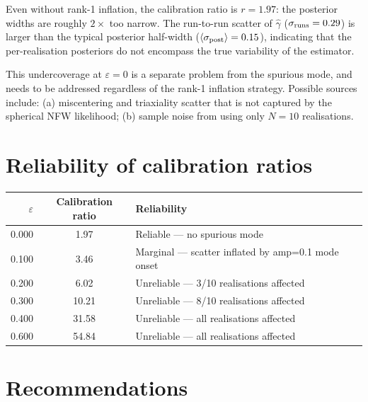 \documentclass[11pt,a4paper]{article}
\begin{document}
Even without rank-1 inflation, the calibration ratio is $r = 1.97$: the
posterior widths are roughly $2\times$ too narrow.  The run-to-run scatter of
$\hat\gamma$ ($\sigma_{\rm runs} = 0.29$) is larger than the typical posterior
half-width ($\langle\sigma_{\rm post}\rangle = 0.15$), indicating that the
per-realisation posteriors do not encompass the true variability of the
estimator.

This undercoverage at $\varepsilon=0$ is a separate problem from the spurious
mode, and needs to be addressed regardless of the rank-1 inflation strategy.
Possible sources include: (a) miscentering and triaxiality scatter that is not
captured by the spherical NFW likelihood; (b) sample noise from using only
$N=10$ realisations.

\section{Reliability of calibration ratios}

\begin{center}
\begin{tabular}{r c l}
\toprule
$\varepsilon$ & Calibration ratio & Reliability \\
\midrule
0.000 & 1.97 & \textcolor{okgreen}{Reliable — no spurious mode} \\
0.100 & 3.46 & \textcolor{warnorange}{Marginal — scatter inflated by amp=0.1 mode onset} \\
0.200 & 6.02 & \textcolor{warnred}{Unreliable — 3/10 realisations affected} \\
0.300 & 10.21 & \textcolor{warnred}{Unreliable — 8/10 realisations affected} \\
0.400 & 31.58 & \textcolor{warnred}{Unreliable — all realisations affected} \\
0.600 & 54.84 & \textcolor{warnred}{Unreliable — all realisations affected} \\
\bottomrule
\end{tabular}
\end{center}

\section{Recommendations}
\end{document}
